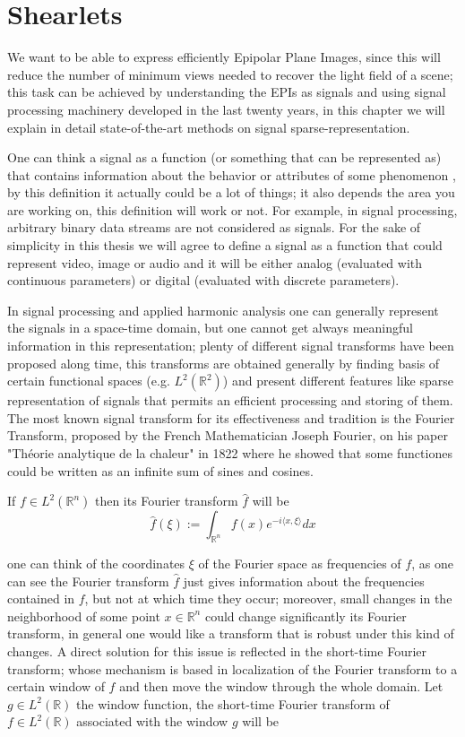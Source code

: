 \chapter{Shearlets}

We want to be able to express efficiently Epipolar Plane Images, since this will reduce the number of minimum views needed to recover the light field of a scene; this task can be achieved by understanding the EPIs as signals and using signal processing machinery developed in the last twenty years, in this chapter we will explain in detail state-of-the-art methods on signal sparse-representation.

\bigskip

One can think a signal as a function (or something that can be represented as) that contains information about the behavior or attributes of some phenomenon \cite{Roland}, by this definition it actually could be a lot of things; it also depends the area you are working on, this definition will work or not. For example, in signal processing, arbitrary binary data streams are not considered as signals. For the sake of simplicity in this thesis we will agree to define a signal as a function that could represent video, image or audio and it will be either analog (evaluated with continuous parameters) or digital (evaluated with discrete parameters). 

\bigskip

In signal processing and applied harmonic analysis one can generally represent the signals in a space-time domain, but one cannot get always meaningful information in this representation; plenty of different signal transforms have been proposed along time, this transforms are obtained generally by finding basis of certain functional spaces (e.g. $L^2(\mathbb{R}^2)$) and present different features like sparse representation of signals that permits an efficient processing and storing of them. The most known signal transform for its effectiveness and tradition is the Fourier Transform, proposed by the French Mathematician Joseph Fourier, on his paper "Théorie analytique de la chaleur" in 1822 where he showed that some functiones could be written as an infinite sum of sines and cosines. 

\bigskip

If $f\in L^2(\mathbb{R}^n)$ then its Fourier transform $\hat{f}$ will be 
$$
\hat{f}(\xi) := \int_{\mathbb{R}^n}f(x)e^{-i\langle x,\xi\rangle}dx
$$

one can think of the coordinates $\xi$ of the Fourier space as frequencies of $f$, as one can see the Fourier transform $\hat{f}$ just gives information about the frequencies contained in $f$, but not at which time they occur; moreover, small changes in the neighborhood of some point $x\in\mathbb{R}^n$ could change significantly its Fourier transform, in general one would like a transform that is robust under this kind of changes. A direct solution for this issue is reflected in the short-time Fourier transform; whose mechanism is based in localization of the Fourier transform to a certain window of $f$ and then move the window through the whole domain. Let $g\in L^2(\mathbb{R})$ the window function, the short-time Fourier transform of $f\in L^2(\mathbb{R})$ associated with the window $g$ will be

